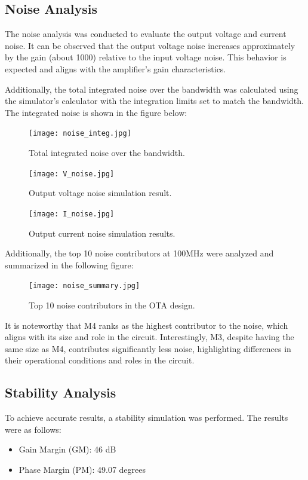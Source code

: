 \documentclass[12pt,a4paper]{article}
\begin{document}
\pagebreak

\subsection*{Noise Analysis}
The noise analysis was conducted to evaluate the output voltage and current noise. It can be observed that the output voltage noise increases approximately by the gain (about 1000) relative to the input voltage noise. This behavior is expected and aligns with the amplifier's gain characteristics.

Additionally, the total integrated noise over the bandwidth was calculated using the simulator's calculator with the integration limits set to match the bandwidth. The integrated noise is shown in the figure below:

\begin{figure}[H]
    \centering
    \texttt{[image: noise\_integ.jpg]}
    \caption{Total integrated noise over the bandwidth.}
    \label{fig:noise_integ}
\end{figure}

\begin{figure}[H]
    \centering
    \texttt{[image: V\_noise.jpg]}
    \caption{Output voltage noise simulation result.}
    \label{fig:voltage_noise}
\end{figure}

\begin{figure}[H]
    \centering
    \texttt{[image: I\_noise.jpg]}
    \caption{Output current noise simulation results.}
    \label{fig:current_noise}
\end{figure}
\newpage
Additionally, the top 10 noise contributors at 100MHz were analyzed and summarized in the following figure:

\begin{figure}[H]
    \centering
    \texttt{[image: noise\_summary.jpg]}
    \caption{Top 10 noise contributors in the OTA design.}
    \label{fig:noise_summary}
\end{figure}

It is noteworthy that M4 ranks as the highest contributor to the noise, which aligns with its size and role in the circuit. Interestingly, M3, despite having the same size as M4, contributes significantly less noise, highlighting differences in their operational conditions and roles in the circuit.

\pagebreak

\subsection*{Stability Analysis}
To achieve accurate results, a stability simulation was performed. The results were as follows:
\begin{itemize}
    \item Gain Margin (GM): 46 dB
    \item Phase Margin (PM): 49.07 degrees 
\end{itemize}
\end{document}
